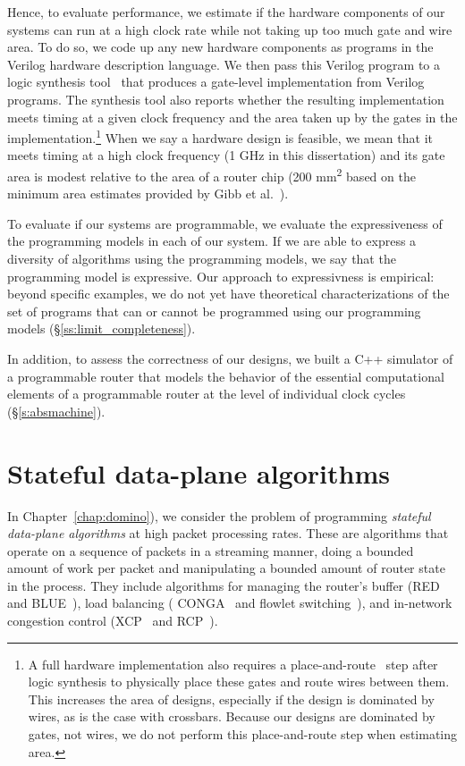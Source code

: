 Hence, to evaluate performance, we estimate if the hardware components of our
systems can run at a high clock rate while not taking up too much gate and wire
area. To do so, we code up any new hardware components as programs in the
Verilog hardware description language.  We then pass this Verilog program to a
logic synthesis tool~\cite{synopsys_dc, cadence_rc} that produces a gate-level
implementation from Verilog programs.  The synthesis tool also reports whether
the resulting implementation meets timing at a given clock frequency and the
area taken up by the gates in the implementation.\footnote{A full hardware
implementation also requires a place-and-route~\cite{par} step after logic
synthesis to physically place these gates and route wires between them. This
increases the area of designs, especially if the design is dominated by wires,
as is the case with crossbars. Because our designs are dominated by gates, not
wires, we do not perform this place-and-route step when estimating area.} When
we say a hardware design is feasible, we mean that it meets timing at a high
clock frequency (1 GHz in this dissertation) and its gate area is modest
relative to the area of a router chip (200 \si{\milli\meter\squared} based on
the minimum area estimates provided by Gibb et al.~\cite{gibb_parsing}). 

To evaluate if our systems are programmable, we evaluate the expressiveness of
the programming models in each of our system. If we are able to express a
diversity of algorithms using the programming models, we say that the
programming model is expressive. Our approach to expressivness is empirical:
beyond specific examples, we do not yet have theoretical characterizations of
the set of programs that can or cannot be programmed using our programming
models (\S\ref{ss:limit_completeness}).

In addition, to assess the correctness of our designs, we built a C++ simulator
of a programmable router that models the behavior of the essential
computational elements of a programmable router at the level of individual
clock cycles (\S\ref{s:absmachine}).

\section{Stateful data-plane algorithms}
In Chapter~\ref{chap:domino}), we consider the problem of programming {\em
stateful data-plane algorithms} at high packet processing rates. These are
algorithms that operate on a sequence of packets in a streaming manner, doing
a bounded amount of work per packet and manipulating a bounded amount of router
state in the process.  They include algorithms for managing the router's buffer
(\eg RED~\cite{red} and BLUE~\cite{blue}), load balancing (\eg
CONGA~\cite{conga} and flowlet switching~\cite{flowlets}), and in-network
congestion control (\eg XCP~\cite{xcp} and RCP~\cite{rcp}).

